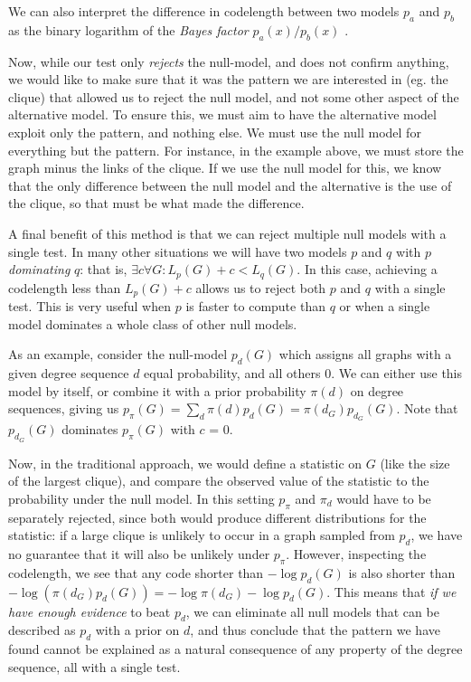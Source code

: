 We can also interpret the difference in codelength between two models $p_a$ and $p_b$  as the binary logarithm of the \emph{Bayes factor} $p_a(x)/p_b(x)$ \cite[Section~14.2.3]{grunwald2007minimum}. 

Now, while our test  only \emph{rejects} the null-model, and does not confirm anything, we would like to make sure that it was the pattern we are interested in (eg. the clique) that allowed us to reject the null model, and not some other aspect of the alternative model. To ensure this, we must aim to have the alternative model exploit only the pattern, and nothing else. We must use the null model for everything but the pattern. For instance, in the example above, we must store the graph minus the links of the clique. If we use the null model for this, we know that the only difference between the null model and the alternative is the use of the clique, so that must be what made the difference.

A final benefit of this method is that we can reject multiple null models with a single test. In many other situations we will have two models $p$ and $q$ with $p$ \emph{dominating} $q$: that is, $\exists c \forall G:  L_p(G) + c< L_q(G)$. In this case, achieving a codelength less than $L_p(G) + c$ allows us to reject both $p$ and $q$ with a single test. This is very useful when $p$ is faster to compute than $q$ or when a single model dominates a whole class of other null models.

As an example, consider the null-model $p_d(G)$ which assigns all graphs with a given degree sequence $d$ equal probability, and all others $0$. We can either use this model by itself, or combine it with a prior probability $\pi(d)$ on degree sequences, giving us $p_\pi(G) = \sum_{d} \pi(d) p_d(G) = \pi(d_G) p_{d_G}(G)$. Note that $p_{d_G}(G)$ dominates $p_\pi(G)$ with $c$ = 0.

Now, in the traditional approach, we would define a statistic on $G$ (like the size of the largest clique), and compare the observed value of the statistic to the probability under the null model. In this setting $p_\pi$ and $\pi_d$ would have to be separately rejected, since both would produce different distributions for the statistic: if a large clique is unlikely to occur in a graph sampled from $p_d$, we have no guarantee that it will also be unlikely under $p_\pi$. However, inspecting the codelength, we see that any code shorter than $- \log p_d(G)$ is also shorter than $-\log (\pi(d_G) p_d(G)) = -\log \pi(d_G) -\log  p_d(G)$. This means that \emph{if we have enough evidence} to beat $p_d$, we can eliminate all null models that can be described as  $p_d$ with a prior on $d$, and thus conclude that the pattern we have found cannot be explained as a natural consequence of any property of the degree sequence, all with a single test.

